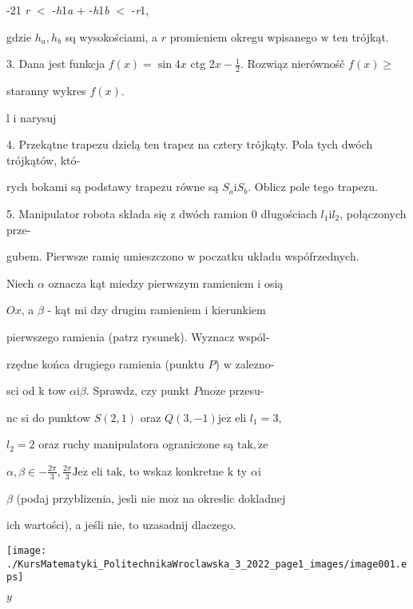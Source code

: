 \documentclass[a4paper,12pt]{article}
\begin{document}
-21  {\it r} $<$ -{\it h}1{\it a} $+$ -{\it h}1{\it b} $<$ -{\it r}1,

gdzie $h_{a}, h_{b}$ sq wysokościami, a $r$ promieniem okregu wpisanego $\mathrm{w}$ ten trójkąt.

3. Dana jest funkcja $f(x) = \sin 4x$ ctg $2x-\displaystyle \frac{1}{2}$. Rozwiąz nierównośč $f(x) \geq$

staranny wykres $f(x).$

l i narysuj

4. Przekątne trapezu dzielą ten trapez na cztery trójkąty. Pola tych dwóch trójkątów, któ-

rych bokami są podstawy trapezu równe są $S_{a}\mathrm{i}S_{b}$. Oblicz pole tego trapezu.

5. Manipulator robota składa się $\mathrm{z}$ dwóch ramion $0$ długościach $l_{1}\mathrm{i}l_{2}$, połączonych prze-

gubem. Pierwsze ramię umieszczono $\mathrm{w}$ poczatku układu wspófrzednych.

Niech $\alpha$ oznacza kąt miedzy pierwszym ramieniem $\mathrm{i}$ osią

$Ox$, a $\beta$ - kąt mi dzy drugim ramieniem $\mathrm{i}$ kierunkiem

pierwszego ramienia (patrz rysunek). Wyznacz wspól-

rzędne końca drugiego ramienia (punktu $P$) $\mathrm{w}$ zalezno-

sci od $\mathrm{k}$ tow $\alpha \mathrm{i}\beta$. Sprawdz, czy punkt $P\mathrm{m}\mathrm{o}\dot{\mathrm{z}}\mathrm{e}$ przesu-

$\mathrm{n} \mathrm{c}$ si do punktow $S(2,1)$ oraz $Q(3,-1)\mathrm{j}\mathrm{e}\dot{\mathrm{z}}$ eli $l_{1} =3,$

$l_{2} = 2$ oraz ruchy manipulatora ograniczone są $\mathrm{t}\mathrm{a}\mathrm{k}, \dot{\mathrm{z}}\mathrm{e}$

$\alpha, \beta\in -\displaystyle \frac{2\pi}{3}, \displaystyle \frac{2\pi}{3} \mathrm{J}\mathrm{e}\dot{\mathrm{z}}$ eli $\mathrm{t}\mathrm{a}\mathrm{k}$, to wskaz konkretne $\mathrm{k}$ ty $\alpha \mathrm{i}$

$\beta$ (podaj przyblizenia, jesli nie $\mathrm{m}\mathrm{o}\dot{\mathrm{z}}$ na okreslic dokladnej

ich wartości), a jeśli $\mathrm{n}\mathrm{i}\mathrm{e}$, to uzasadnij dlaczego.
\begin{center}
\texttt{[image: ./KursMatematyki\_PolitechnikaWroclawska\_3\_2022\_page1\_images/image001.eps]}
\end{center}
$y$
\end{document}
